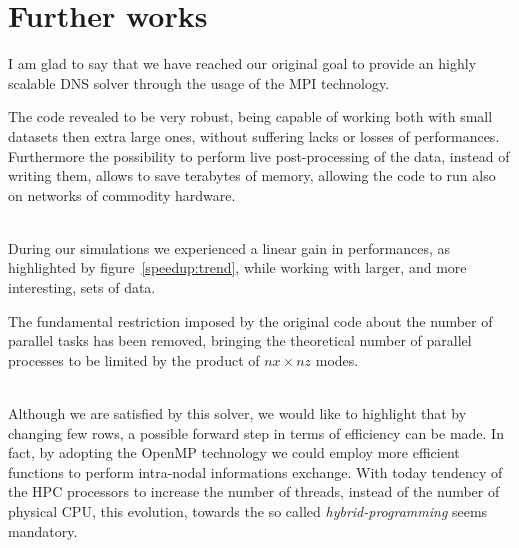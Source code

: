 \chapter{Further works}
I am glad to say that we have reached our original goal to provide an highly scalable DNS solver through the usage of the MPI technology. \par
The code revealed to be very robust, being capable of working both with small datasets then extra large ones, without suffering lacks or losses of performances.
Furthermore the possibility to perform live post-processing of the data, instead of writing them, allows to save terabytes of memory, allowing the code to run also on networks of commodity hardware. \\~\par
During our simulations we experienced a linear gain in performances, as highlighted by figure~\ref{speedup:trend}, while working with larger, and more interesting, sets of data. \par
The fundamental restriction imposed by the original code about the number of parallel tasks has been removed, bringing the theoretical number of parallel processes to be limited by the product of $nx \times nz$ modes. \\~\par
Although we are satisfied by this solver, we would like to highlight that by changing few rows, a possible forward step in terms of efficiency can be made.
In fact, by adopting the OpenMP technology we could employ more efficient functions to perform intra-nodal informations exchange. With today tendency of the HPC processors to increase the number of threads, instead of the number of physical CPU, this evolution, towards the so called \emph{hybrid-programming} seems mandatory.
